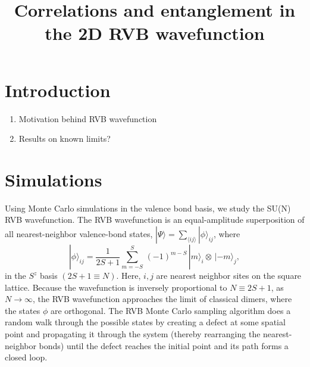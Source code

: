 \documentclass{article}
\title{Correlations and entanglement in the 2D RVB wavefunction}
\begin{document}
\maketitle

\section{Introduction}
\begin{enumerate}
\item Motivation behind RVB wavefunction
\item Results on known limits?
\end{enumerate}

\section{Simulations}
Using Monte Carlo simulations in the valence bond basis, we study the SU(N) RVB wavefunction.
The RVB wavefunction is an equal-amplitude superposition of all nearest-neighbor valence-bond states, $| \Psi \rangle = \sum_{\langle i j \rangle} | \phi \rangle_{ij}$, where
%
\begin{equation}
	\displaystyle
	\label{eq:wf}
	| \phi \rangle_{ij} = \frac{1}{2S + 1} \sum_{m = -S}^{S} \, (-1)^{m-S} \, | m \rangle_i \otimes \, | -m \rangle_j,
\end{equation}
%
in the $S^z$ basis $(2S+1 \equiv N)$.
Here, $i, j$ are nearest neighbor sites on the square lattice.
Because the wavefunction is inversely proportional to $N \equiv 2S+1$, as $N \to \infty$, the RVB wavefunction approaches the limit of classical dimers, where the states $\phi$ are orthogonal.
The RVB Monte Carlo sampling algorithm does a random walk through the possible states by creating a defect at some spatial point and propagating it through the system (thereby rearranging the nearest-neighbor bonds) until the defect reaches the initial point and its path forms a closed loop.
\end{document}
